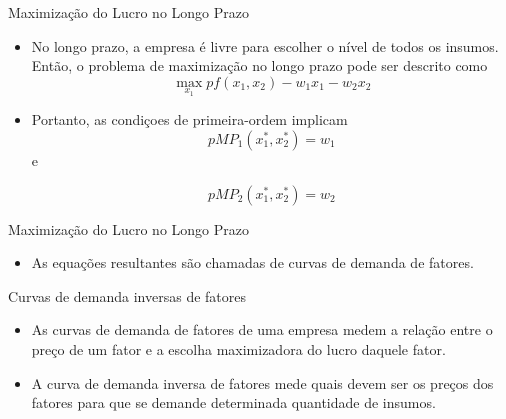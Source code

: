 \documentclass[aspectratio=169]{beamer}
\begin{document}
\begin{frame}{Maximização do Lucro no Longo Prazo}

\begin{block}{ }

\begin{itemize}
    \item No longo prazo, a empresa é livre para escolher o nível de todos os insumos. Então, o problema de maximização no longo prazo pode ser descrito como $$\max_{x_1} pf(x_1, x_2) - w_1 x_1 - w_2 x_2  $$
    \item Portanto, as condiçoes de primeira-ordem implicam $$pMP_1 (x^*_1, x^*_2) = w_1$$ e

    $$pMP_2 (x^*_1, x^*_2) = w_2$$
    
    
  
\end{itemize}

\end{block}
\end{frame}

\begin{frame}{Maximização do Lucro no Longo Prazo}

\begin{block}{ }

\begin{itemize}
    \item As equações resultantes são chamadas de \alert{curvas de demanda de fatores.}
    
  
\end{itemize}

\end{block}
\end{frame}

\begin{frame}{Curvas de demanda inversas de fatores}

\begin{block}{ }

\begin{itemize}
    \item As \alert{curvas de demanda de fatores} de uma empresa medem a relação entre o preço de um fator e a escolha maximizadora do lucro daquele fator.
    \item A \alert{curva de demanda inversa de fatores} mede quais devem ser os preços dos fatores para que se demande determinada quantidade de insumos.
\end{itemize}

\end{block}
\end{frame}
\end{document}
